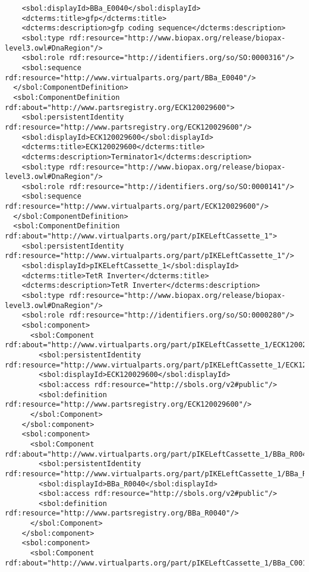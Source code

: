 \begin{lstlisting}
    <sbol:displayId>BBa_E0040</sbol:displayId>
    <dcterms:title>gfp</dcterms:title>
    <dcterms:description>gfp coding sequence</dcterms:description>
    <sbol:type rdf:resource="http://www.biopax.org/release/biopax-level3.owl#DnaRegion"/>
    <sbol:role rdf:resource="http://identifiers.org/so/SO:0000316"/>
    <sbol:sequence rdf:resource="http://www.virtualparts.org/part/BBa_E0040"/>
  </sbol:ComponentDefinition>
  <sbol:ComponentDefinition rdf:about="http://www.partsregistry.org/ECK120029600">
    <sbol:persistentIdentity rdf:resource="http://www.partsregistry.org/ECK120029600"/>
    <sbol:displayId>ECK120029600</sbol:displayId>
    <dcterms:title>ECK120029600</dcterms:title>
    <dcterms:description>Terminator1</dcterms:description>
    <sbol:type rdf:resource="http://www.biopax.org/release/biopax-level3.owl#DnaRegion"/>
    <sbol:role rdf:resource="http://identifiers.org/so/SO:0000141"/>
    <sbol:sequence rdf:resource="http://www.virtualparts.org/part/ECK120029600"/>
  </sbol:ComponentDefinition>
  <sbol:ComponentDefinition rdf:about="http://www.virtualparts.org/part/pIKELeftCassette_1">
    <sbol:persistentIdentity rdf:resource="http://www.virtualparts.org/part/pIKELeftCassette_1"/>
    <sbol:displayId>pIKELeftCassette_1</sbol:displayId>
    <dcterms:title>TetR Inverter</dcterms:title>
    <dcterms:description>TetR Inverter</dcterms:description>
    <sbol:type rdf:resource="http://www.biopax.org/release/biopax-level3.owl#DnaRegion"/>
    <sbol:role rdf:resource="http://identifiers.org/so/SO:0000280"/>
    <sbol:component>
      <sbol:Component rdf:about="http://www.virtualparts.org/part/pIKELeftCassette_1/ECK120029600">
        <sbol:persistentIdentity rdf:resource="http://www.virtualparts.org/part/pIKELeftCassette_1/ECK120029600"/>
        <sbol:displayId>ECK120029600</sbol:displayId>
        <sbol:access rdf:resource="http://sbols.org/v2#public"/>
        <sbol:definition rdf:resource="http://www.partsregistry.org/ECK120029600"/>
      </sbol:Component>
    </sbol:component>
    <sbol:component>
      <sbol:Component rdf:about="http://www.virtualparts.org/part/pIKELeftCassette_1/BBa_R0040">
        <sbol:persistentIdentity rdf:resource="http://www.virtualparts.org/part/pIKELeftCassette_1/BBa_R0040"/>
        <sbol:displayId>BBa_R0040</sbol:displayId>
        <sbol:access rdf:resource="http://sbols.org/v2#public"/>
        <sbol:definition rdf:resource="http://www.partsregistry.org/BBa_R0040"/>
      </sbol:Component>
    </sbol:component>
    <sbol:component>
      <sbol:Component rdf:about="http://www.virtualparts.org/part/pIKELeftCassette_1/BBa_C0012">

\end{lstlisting}
